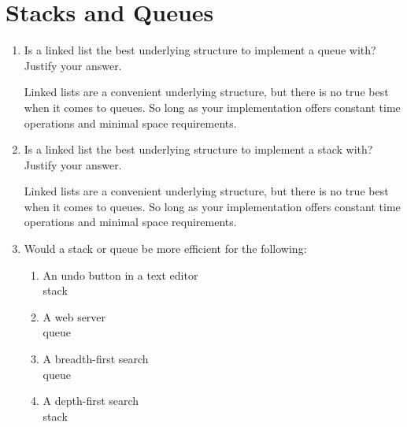 \documentclass[11pt]{article}
\begin{document}
    \section{Stacks and Queues}
    \begin{enumerate}

        \item Is a linked list the best underlying structure to implement a queue with? Justify your answer. 

        Linked lists are a convenient underlying structure, but there is no true best when it comes to queues. So long as your implementation offers constant time operations and minimal space requirements.
        
        \item Is a linked list the best underlying structure to implement a stack with? Justify your answer. 

        Linked lists are a convenient underlying structure, but there is no true best when it comes to queues. So long as your implementation offers constant time operations and minimal space requirements.
        
        \item Would a stack or queue be more efficient for the following:
        \begin{enumerate}
            \item An undo button in a text editor\\
            stack
            \item A web server\\
            queue
            \item A breadth-first search\\
            queue
            \item A depth-first search\\
            stack
        \end{enumerate}
    \end{enumerate}
    
    \label{r:lastpage}
    
    
\end{document}
